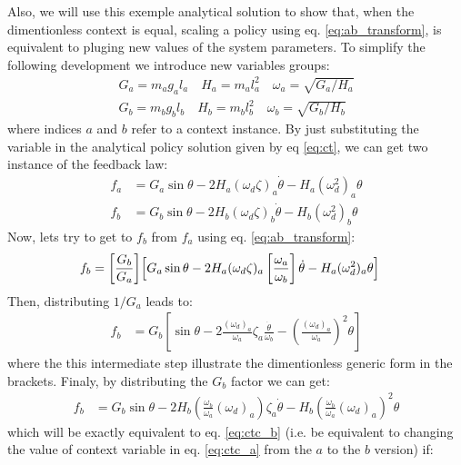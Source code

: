Also, we will use this exemple analytical solution to show that, when the dimentionless context is equal, scaling a policy using eq. \eqref{eq:ab_transform}, is equivalent to pluging new values of the system parameters. To simplify the following development we introduce new variables groups:
\begin{align}
G_a=m_a g_a l_a \quad H_a=m_a l_a^2 \quad \omega_a = \sqrt{G_a/H_a} \\
G_b=m_b g_b l_b \quad H_b=m_b l_b^2 \quad \omega_b = \sqrt{G_b/H_b}
\end{align}
where indices $a$ and $b$ refer to a context instance. By just substituting the variable in the analytical policy solution given by eq \eqref{eq:ct}, we can get two instance of the feedback law:
\begin{align}
f_a &= G_a \sin \theta - 2 H_a (\omega_d \zeta )_a \dot{\theta} - H_a( \omega_d^2)_a \theta \label{eq:ctc_a} \\
f_b &= G_b \sin \theta - 2 H_b (\omega_d \zeta )_b \dot{\theta} - H_b( \omega_d^2)_b \theta
\label{eq:ctc_b}
\end{align}
Now, lets try to get to $f_b$ from $f_a$ using eq. \eqref{eq:ab_transform}:
\begin{align}
f_b &= \left[ \frac{G_b}{G_a} \right] \Bigr[  G_a \sin \theta - 2 H_a ( \omega_d \zeta )_a \left[\frac{\omega_a}{\omega_b} \right] \dot{\theta}  - H_a ( \omega_d^2)_a \theta \Bigl]  
\end{align}
Then, distributing $1/G_a$ leads to:
\begin{align}
f_b &= G_b \left[  \sin \theta - 2 \frac{(\omega_d )_a }{\omega_a } \zeta_a \frac{\dot{ \theta }}{\omega_b} - \left(\frac{(\omega_d )_a }{\omega_a }\right)^2 \theta \right]
\end{align}
where the this intermediate step illustrate the dimentionless generic form in the brackets. Finaly, by distributing the $G_b$ factor we can get:
\begin{align}
f_b &= G_b  \sin \theta - 2 H_b  
\left( \frac{\omega_b}{\omega_a} (\omega_d )_a
\right) \zeta_a \dot{ \theta }
- H_b 
\left( 
\frac{\omega_b}{\omega_a} (\omega_d)_a 
\right)^2 
\theta
\end{align}
which will be exactly equivalent to eq. \eqref{eq:ctc_b} (i.e. be equivalent to changing the value of context variable in eq. \eqref{eq:ctc_a} from the $a$ to the $b$ version) if:
